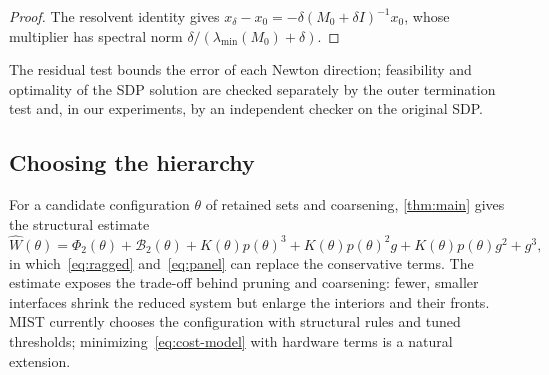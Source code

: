 \begin{proof}
The resolvent identity gives $x_\delta-x_0=-\delta(M_0+\delta I)^{-1}x_0$, whose
multiplier has spectral norm $\delta/(\lambda_{\min}(M_0)+\delta)$.
\end{proof}

The residual test bounds the error of each Newton direction; feasibility and
optimality of the SDP solution are checked separately by the outer termination
test and, in our experiments, by an independent checker on the original SDP.

\subsection{Choosing the hierarchy}\label{sec:select}

For a candidate configuration $\theta$ of retained sets and coarsening,
\cref{thm:main} gives the structural estimate
\begin{equation}\label{eq:cost-model}
\widehat W(\theta)=\Phi_2(\theta)+\mathcal B_2(\theta)+K(\theta)p(\theta)^3
+K(\theta)p(\theta)^2g+K(\theta)p(\theta)g^2+g^3,
\end{equation}
in which~\eqref{eq:ragged} and~\eqref{eq:panel} can replace the conservative terms.
The estimate exposes the trade-off behind pruning and coarsening: fewer, smaller
interfaces shrink the reduced system but enlarge the interiors and their fronts.
MIST currently chooses the configuration with structural rules and tuned
thresholds; minimizing~\eqref{eq:cost-model} with hardware terms is a natural
extension.
